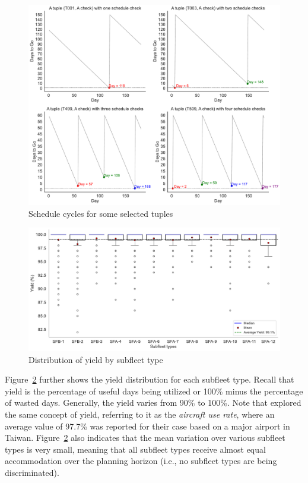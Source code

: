 \begin{figure}[htbp]
    \centering
    \includegraphics[width=0.9\linewidth]{schd_cycle.pdf}
    \caption{Schedule cycles for some selected tuples }
    \label{fig:schd_tuple_cycles}
\end{figure}


\begin{figure}[htbp]
    \centering
    \includegraphics[width=\linewidth]{yields.pdf}
    \caption{Distribution of yield by  subfleet type}
    \label{fig:yieldist}
\end{figure}

Figure~\ref{fig:yieldist} further shows the yield distribution for each subfleet type. Recall that yield is the percentage of useful days being utilized or 100\% minus the percentage of wasted days. Generally, the yield varies from 90\% to 100\%. Note that \cite{yan2008long} explored the same concept of yield, referring to it as the \textit{aircraft use rate}, where an average value of 97.7\% was reported for their case based on a major airport in Taiwan.
Figure~\ref{fig:yieldist} also indicates that the mean variation over various subfleet types is very small, meaning that all subfleet types receive almost equal accommodation over the planning horizon (i.e., no subfleet types are being discriminated).

